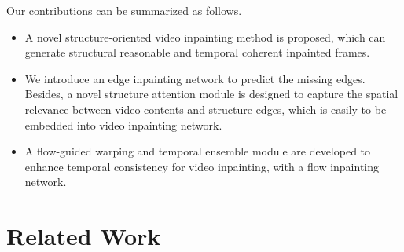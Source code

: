 Our contributions can be summarized as follows.
\begin{itemize}
	\item A novel structure-oriented video inpainting method is proposed, which can generate structural reasonable and temporal coherent inpainted frames.
	
	\item We introduce an edge inpainting network to predict the missing edges. Besides, a novel structure attention module is designed to capture the spatial relevance between video contents and structure edges, which is easily to be embedded into video inpainting network. %
	\item A flow-guided warping and temporal ensemble module are developed to enhance temporal consistency for video inpainting, with a flow inpainting network.

	
	
\end{itemize}





\section{Related Work}
